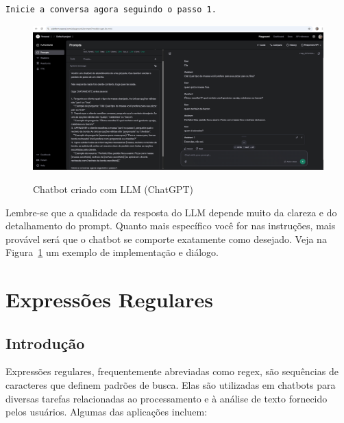 \documentclass[14pt,a4paper,oneside]{book}
\begin{document}
\begin{lstlisting}[language=Tex]
Inicie a conversa agora seguindo o passo 1.
\end{lstlisting}

\vspace{\baselineskip}

\begin{figure}[!htbp]
	\centering
	\caption{Chatbot criado com LLM (ChatGPT)}
	\includegraphics[width=1\linewidth]{./fig/chat_chatgpt_pizza.png}
	\label{fig:chat_chatgpt_pizza}
\end{figure}

Lembre-se que a qualidade da resposta do LLM depende muito da clareza e do detalhamento do prompt. Quanto mais específico você for nas instruções, mais provável será que o chatbot se comporte exatamente como desejado. Veja na Figura~\ref{fig:chat_chatgpt_pizza} um exemplo de implementação e diálogo.


\chapter{Expressões Regulares}

\section{Introdução}

Expressões regulares, frequentemente abreviadas como regex, são sequências de caracteres que definem padrões de busca. Elas são utilizadas em chatbots para diversas tarefas relacionadas ao processamento e à análise de texto fornecido pelos usuários. Algumas das aplicações incluem:
\end{document}
